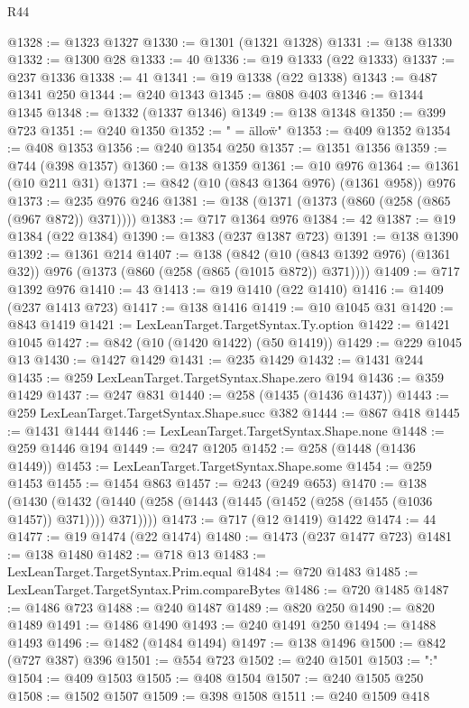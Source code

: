 \begin{lexlean}{R44}
\begin{coremodule}
@1328 := @1323 @1327
@1330 := @1301 (@1321 @1328)
@1331 := @138 @1330
@1332 := @1300 @28
@1333 := 40
@1336 := @19 @1333 (@22 @1333)
@1337 := @237 @1336
@1338 := 41
@1341 := @19 @1338 (@22 @1338)
@1343 := @487 @1341 @250
@1344 := @240 @1343
@1345 := @808 @403
@1346 := @1344 @1345
@1348 := @1332 (@1337 @1346)
@1349 := @138 @1348
@1350 := @399 @723
@1351 := @240 @1350
@1352 := " = \"allow\"\n"
@1353 := @409 @1352
@1354 := @408 @1353
@1356 := @240 @1354 @250
@1357 := @1351 @1356
@1359 := @744 (@398 @1357)
@1360 := @138 @1359
@1361 := @10 @976
@1364 := @1361 (@10 @211 @31)
@1371 := @842 (@10 (@843 @1364 @976) (@1361 @958)) @976
@1373 := @235 @976 @246
@1381 := @138 (@1371 (@1373 (@860 (@258 (@865 (@967 @872)) @371))))
@1383 := @717 @1364 @976
@1384 := 42
@1387 := @19 @1384 (@22 @1384)
@1390 := @1383 (@237 @1387 @723)
@1391 := @138 @1390
@1392 := @1361 @214
@1407 := @138
    (@842 (@10 (@843 @1392 @976) (@1361 @32)) @976 (@1373 (@860 (@258 (@865 (@1015 @872)) @371))))
@1409 := @717 @1392 @976
@1410 := 43
@1413 := @19 @1410 (@22 @1410)
@1416 := @1409 (@237 @1413 @723)
@1417 := @138 @1416
@1419 := @10 @1045 @31
@1420 := @843 @1419
@1421 := LexLeanTarget.TargetSyntax.Ty.option
@1422 := @1421 @1045
@1427 := @842 (@10 (@1420 @1422) (@50 @1419))
@1429 := @229 @1045 @13
@1430 := @1427 @1429
@1431 := @235 @1429
@1432 := @1431 @244
@1435 := @259 LexLeanTarget.TargetSyntax.Shape.zero @194
@1436 := @359 @1429
@1437 := @247 @831
@1440 := @258 (@1435 (@1436 @1437))
@1443 := @259 LexLeanTarget.TargetSyntax.Shape.succ @382
@1444 := @867 @418
@1445 := @1431 @1444
@1446 := LexLeanTarget.TargetSyntax.Shape.none
@1448 := @259 @1446 @194
@1449 := @247 @1205
@1452 := @258 (@1448 (@1436 @1449))
@1453 := LexLeanTarget.TargetSyntax.Shape.some
@1454 := @259 @1453
@1455 := @1454 @863
@1457 := @243 (@249 @653)
@1470 := @138
    (@1430 (@1432 (@1440 (@258 (@1443 (@1445 (@1452 (@258 (@1455 (@1036 @1457)) @371)))) @371))))
@1473 := @717 (@12 @1419) @1422
@1474 := 44
@1477 := @19 @1474 (@22 @1474)
@1480 := @1473 (@237 @1477 @723)
@1481 := @138 @1480
@1482 := @718 @13
@1483 := LexLeanTarget.TargetSyntax.Prim.equal
@1484 := @720 @1483
@1485 := LexLeanTarget.TargetSyntax.Prim.compareBytes
@1486 := @720 @1485
@1487 := @1486 @723
@1488 := @240 @1487
@1489 := @820 @250
@1490 := @820 @1489
@1491 := @1486 @1490
@1493 := @240 @1491 @250
@1494 := @1488 @1493
@1496 := @1482 (@1484 @1494)
@1497 := @138 @1496
@1500 := @842 (@727 @387) @396
@1501 := @554 @723
@1502 := @240 @1501
@1503 := ":"
@1504 := @409 @1503
@1505 := @408 @1504
@1507 := @240 @1505 @250
@1508 := @1502 @1507
@1509 := @398 @1508
@1511 := @240 @1509 @418

\end{coremodule}
\end{lexlean}
